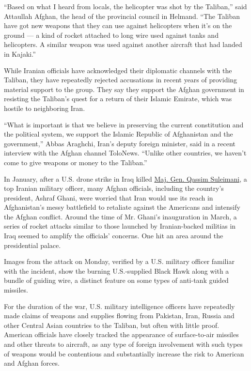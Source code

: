``Based on what I heard from locals, the helicopter was shot by the
Taliban,'' said Attaullah Afghan, the head of the provincial council in
Helmand. ``The Taliban have got new weapons that they can use against
helicopters when it's on the ground --- a kind of rocket attached to
long wire used against tanks and helicopters. A similar weapon was used
against another aircraft that had landed in Kajaki.''

While Iranian officials have acknowledged their diplomatic channels with
the Taliban, they have repeatedly rejected accusations in recent years
of providing material support to the group. They say they support the
Afghan government in resisting the Taliban's quest for a return of their
Islamic Emirate, which was hostile to neighboring Iran.

``What is important is that we believe in preserving the current
constitution and the political system, we support the Islamic Republic
of Afghanistan and the government,'' Abbas Araghchi, Iran's deputy
foreign minister, said in a recent interview with the Afghan channel
ToloNews. ``Unlike other countries, we haven't come to give weapons or
money to the Taliban.''

In January, after a U.S. drone strike in Iraq killed
\href{https://www.nytimes3xbfgragh.onion/2020/01/03/world/middleeast/suleimani-dead.html}{Maj.
Gen. Qassim Suleimani}, a top Iranian military officer, many Afghan
officials, including the country's president, Ashraf Ghani, were worried
that Iran would use its reach in Afghanistan's messy battlefield to
retaliate against the Americans and intensify the Afghan conflict.
Around the time of Mr. Ghani's inauguration in March, a series of rocket
attacks similar to those launched by Iranian-backed militias in Iraq
seemed to amplify the officials' concerns. One hit an area around the
presidential palace.

Images from the attack on Monday, verified by a U.S. military officer
familiar with the incident, show the burning U.S.-supplied Black Hawk
along with a bundle of guiding wire, a distinct feature on some types of
anti-tank guided missiles.

For the duration of the war, U.S. military intelligence officers have
repeatedly made claims of weapons and supplies flowing from Pakistan,
Iran, Russia and other Central Asian countries to the Taliban, but often
with little proof. American officials have closely tracked the
appearance of surface-to-air missiles and other threats to aircraft, as
any type of foreign involvement with such types of weapons would be
contentious and substantially increase the risk to American and Afghan
forces.

